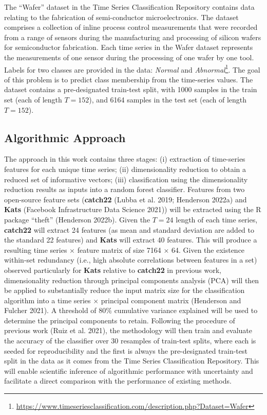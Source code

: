 \documentclass{article}
\begin{document}
The ``Wafer'' dataset in the Time Series Classification Repository
contains data relating to the fabrication of semi-conductor
microelectronics. The dataset comprises a collection of inline process
control measurements that were recorded from a range of sensors during
the manufacturing and processing of silicon wafers for semiconductor
fabrication. Each time series in the Wafer dataset represents the
measurements of one sensor during the processing of one wafer by one
tool. Labels for two classes are provided in the data: \emph{Normal} and
\emph{Abnormal}\footnote{\url{https://www.timeseriesclassification.com/description.php?Dataset=Wafer}}.
The goal of this problem is to predict class membership from the
time-series values. The dataset contains a pre-designated train-test
split, with 1000 samples in the train set (each of length \(T = 152\)),
and 6164 samples in the test set (each of length \(T = 152\)).

\hypertarget{algorithmic-approach}{%
\subsection{Algorithmic Approach}\label{algorithmic-approach}}

The approach in this work contains three stages: (i) extraction of
time-series features for each unique time series; (ii) dimensionality
reduction to obtain a reduced set of informative vectors; (iii)
classification using the dimensionality reduction results as inputs into
a random forest classifier. Features from two open-source feature sets
(\textbf{catch22} (Lubba et al. 2019; Henderson 2022a) and \textbf{Kats}
(Facebook Infrastructure Data Science 2021)) will be extracted using the
R package ``theft'' (Henderson 2022b). Given the \(T = 24\) length of
each time series, \textbf{catch22} will extract 24 features (as mean and
standard deviation are added to the standard 22 features) and
\textbf{Kats} will extract 40 features. This will produce a resulting
time series \(\times\) feature matrix of size 7164 \(\times\) 64. Given
the existence within-set redundancy (i.e., high absolute correlations
between features in a set) observed particularly for \textbf{Kats}
relative to \textbf{catch22} in previous work, dimensionality reduction
through principal components analysis (PCA) will then be applied to
substantially reduce the input matrix size for the classification
algorithm into a time series \(\times\) principal component matrix
(Henderson and Fulcher 2021). A threshold of 80\(\%\) cumulative
variance explained will be used to determine the principal components to
retain. Following the procedure of previous work (Ruiz et al. 2021), the
methodology will then train and evaluate the accuracy of the classifier
over 30 resamples of train-test splits, where each is seeded for
reproducibility and the first is always the pre-designated train-test
split in the data as it comes from the Time Series Classification
Repository. This will enable scientific inference of algorithmic
performance with uncertainty and facilitate a direct comparison with the
performance of existing methods.
\end{document}
